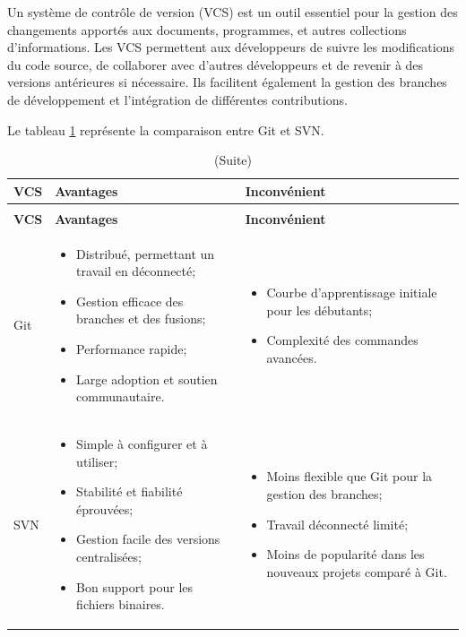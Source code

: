 \documentclass[12pt]{report}
\begin{document}
				\hspace{15pt} Un système de contrôle de version (VCS) est un outil essentiel pour la gestion des changements apportés aux documents, programmes, et autres collections d'informations. Les VCS permettent aux développeurs de suivre les modifications du code source, de collaborer avec d'autres développeurs et de revenir à des versions antérieures si nécessaire. Ils facilitent également la gestion des branches de développement et l'intégration de différentes contributions.


				Le tableau \ref{tab:VCS} représente la comparaison entre Git et SVN.
				
				\begin{longtable}{|p{3cm}|p{5.5cm}|p{5.5cm}|} 
						\caption{Comparaison entre Git et SVN.} 
						\label{tab:VCS}\\ 
						\hline 
						\textbf{VCS}  & \textbf{Avantages} & \textbf{Inconvénient}\\ 
						\hline 
						\endfirsthead 	
						\caption[]{(Suite)}\\ 
						\hline 
						\textbf{VCS}  & \textbf{Avantages} & \textbf{Inconvénient}\\ 
						\hline 
						\endhead
						Git &
						\begin{itemize}
							\item Distribué, permettant un travail en déconnecté;
							\item Gestion efficace des branches et des fusions;
							\item Performance rapide;
							\item Large adoption et soutien communautaire.
						\end{itemize}
						&
						\begin{itemize}
							\item Courbe d'apprentissage initiale pour les débutants;
							\item Complexité des commandes avancées.
						\end{itemize}\\
						\hline
						SVN & 
						\begin{itemize}
							\item Simple à configurer et à utiliser;
							\item Stabilité et fiabilité éprouvées;
							\item Gestion facile des versions centralisées;
							\item Bon support pour les fichiers binaires.
						\end{itemize}
						&
						\begin{itemize}
							\item Moins flexible que Git pour la gestion des branches;
							\item Travail déconnecté limité;
							\item Moins de popularité dans les nouveaux projets comparé à Git.
						\end{itemize} \\
						 \hline
				    \end{longtable}
\end{document}
